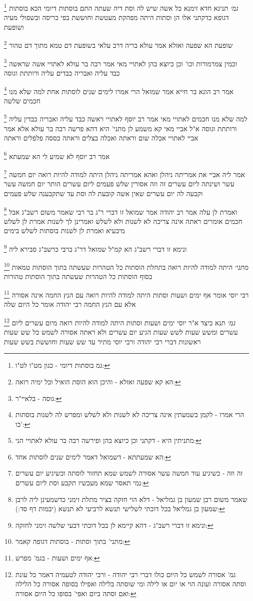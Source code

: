 \documentclass[12pt, openany]{book}
\newcommand{\footnotecomment}[1]{
	\renewcommand\thefootnote{}
	\footnote{#1}}
\newcommand{\commenta}[1]{\footnotecomment{#1}}
\begin{document}
{{\commenta{גמ בוסתות דיומי - כגון מט"ו לט"ו:}
{\large\emph{גמ׳}} תנינא חדא זימנא כל אשה שיש לה וסת דיה שעתה התם בוסתות דיומי הכא בוסתות דגופא 
כדקתני אלו הן וסתות היתה מפהקת מעטשת וחוששת בפי כריסה ובשפולי מעיה ושופעת 
\commenta{הא קא שפעה ואזלא - והיכן הוא הוסת הואיל וכל ימיה רואה:}
שופעת הא שפעה ואזלא אמר עולא בריה דרב עלאי
בשופעת דם טמא מתוך דם טהור 
\commenta{גוסה - בלאיי"ר:}
וכמין צמרמורות וכו' וכן כיוצא בהן לאתויי מאי אמר רבה בר עולא לאתויי אשה שראשה כבד עליה ואבריה כבדים עליה ורותתת וגוסה 
\commenta{הרי אמרו - לקמן בשמעתין אינה צריכה לא לשנות ולא לשלש ומפרש לה לשנות בוסתות כו':}
אמר רב הונא בר חייא אמר שמואל הרי אמרו לימים שנים לוסתות אחת למה שלא מנו חכמים שלשה 
\commenta{מתניתין היא - דקתני וכן כיוצא בהן ופירשה רבה בר עולא לאתויי הני:}
למה שלא מנו חכמים לאתויי מאי אמר רב יוסף לאתויי ראשה כבד עליה ואבריה כבדין עליה ורותתת וגוסה א"ל אביי מאי קא משמע לן מתני' היא דהא פרשה רבה בר עולא אלא אמר אביי לאתויי אכלה שום וראתה ואכלה בצלים וראתה כססה פלפלים וראתה 
\commenta{הא שמעתתא - דשמואל דאמר לימים שנים לוסתות אחד:}
אמר רב יוסף לא שמיע לי הא שמעתא 
\commenta{זה וזה - כשיגיע עוד חמשה עשר אסורה לשמש שמא תחזור לוסתה וכשיגיע יום עשרים נמי תאסר שמא מעכשיו תקבע וסת ליום עשרים:}
אמר ליה אביי את אמריתה ניהלן ואהא אמריתה ניהלן היתה למודה להיות רואה יום חמשה עשר ושינתה ליום עשרים זה וזה אסורין שלש פעמים ליום עשרים הותר יום חמשה עשר וקבעה לה יום עשרים שאין אשה קובעת לה וסת עד שתקבענה שלש פעמים 
\commenta{שאמר משום רבן שמעון בן גמליאל - דלא הוי חזקה בציר מתלת זימני כדשמעינן ליה לרבן שמעון בן גמליאל בכל דוכתי לשלישי תנשא לרביעי לא תנשא (יבמות דף סד:):}
ואמרת לן עלה אמר רב יהודה אמר שמואל זו דברי ר"ג בר רבי שאמר משום רשב"ג אבל חכמים אומרים ראתה אינה צריכה לא לשנות ולא לשלש 
ואמרינן לך לשנות אמרת לן לשלש מיבעיא ואמרת לן לשנות בוסתות לשלש בימים 
\commenta{ונימא זו דברי רשב"ג - דהא קיימא לן בכל דוכתי דבעי שלשה זימני לחזקה:}
ונימא זו דברי רשב"ג הא קמ"ל שמואל דר"ג ברבי כרשב"ג סבירא ליה
\commenta{מתני' בתוך וסתות - בוסתות דגופה קאמר:}
{\large\emph{מתני׳}} היתה למודה להיות רואה בתחלת הוסתות כל הטהרות שעשתה בתוך הוסתות טמאות בסוף הוסתות כל הטהרות שעשתה בתוך הוסתות טהורות 
\commenta{אף ימים ושעות - בגמ' מפרש:}
רבי יוסי אומר אף ימים ושעות וסתות היתה למודה להיות רואה עם הנץ החמה אינה אסורה אלא עם הנץ החמה רבי יהודה אומר כל היום שלה
\commenta{גמ' אסורה לשמש כל היום כולו דברי רבי יהודה - ורבי יהודה לטעמיה דאמר כל עונת וסתה אסורה ועונה הוי או יום או לילה ומי שוסתה בלילה ואפילו בסופה אסורה כל הלילה ואם וסתה ביום ואפי' בסופו כל היום אסורה:}
{\large\emph{גמ׳}} תנא כיצד א"ר יוסי ימים ושעות וסתות היתה למודה להיות רואה מיום עשרים ליום עשרים ומשש שעות לשש שעות הגיע יום עשרים ולא ראתה אסורה לשמש כל שש שעות ראשונות דברי רבי יהודה ורבי יוסי מתיר עד שש שעות וחוששת בשש שעות 
}}
\end{document}
